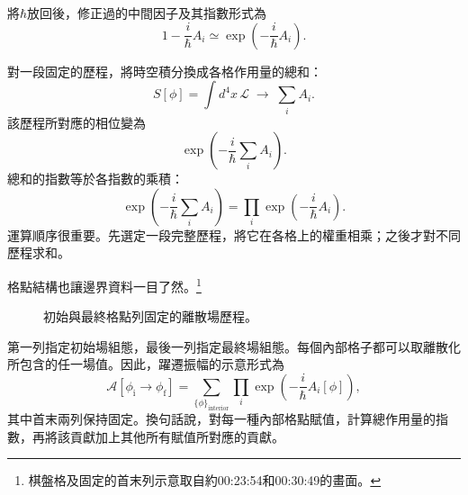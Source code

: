 \begin{classroomqa}
\end{classroomqa}

將\(\hbar\)放回後，修正過的中間因子及其指數形式為
\begin{equation}
1-\frac{i}{\hbar}A_i
\simeq
\exp\!\left(-\frac{i}{\hbar}A_i\right).
\end{equation}

對一段固定的歷程，將時空積分換成各格作用量的總和：
\begin{equation}
S[\phi]
=\int d^4x\,\mathcal{L}
\;\longrightarrow\;
\sum_i A_i.
\end{equation}
該歷程所對應的相位變為
\begin{equation}
\exp\!\left(-\frac{i}{\hbar}\sum_i A_i\right).
\end{equation}
總和的指數等於各指數的乘積：
\begin{equation}
\exp\!\left(-\frac{i}{\hbar}\sum_i A_i\right)
=
\prod_i\exp\!\left(-\frac{i}{\hbar}A_i\right).
\end{equation}
運算順序很重要。先選定一段完整歷程，將它在各格上的權重相乘；之後才對不同歷程求和。

格點結構也讓邊界資料一目了然。\footnote{棋盤格及固定的首末列示意取自約00:23:54和00:30:49的畫面。}
\begin{figure}[htbp]
\centering
{}
\caption{初始與最終格點列固定的離散場歷程。}
\end{figure}

第一列指定初始場組態，最後一列指定最終場組態。每個內部格子都可以取離散化所包含的任一場值。因此，躍遷振幅的示意形式為
\begin{equation}
\mathcal{A}\!\left[\phi_{\mathrm{i}}\rightarrow\phi_{\mathrm{f}}\right]
=
\sum_{\{\phi\}_{\mathrm{interior}}}
\prod_i\exp\!\left(-\frac{i}{\hbar}A_i[\phi]\right),
\end{equation}
其中首末兩列保持固定。換句話說，對每一種內部格點賦值，計算總作用量的指數，再將該貢獻加上其他所有賦值所對應的貢獻。

